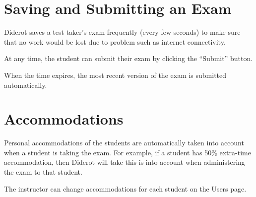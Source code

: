 \section{Saving and Submitting an Exam}

\begin{gram}
Diderot saves a test-taker's exam frequently (every few seconds) to make sure that no work would be lost due to problem such as internet connectivity.  

At any time, the student can submit their exam by clicking the ``Submit'' button.

When the time expires, the most recent version of the exam is submitted automatically.
\end{gram}

\section{Accommodations}

\begin{gram}
Personal accommodations of the students are automatically taken into account when a student is taking the exam.  For example, if a student has 50\% extra-time accommodation, then Diderot will take this is into account when administering the exam to that student.  

The instructor can change accommodations for each student on the Users page. 
\end{gram}

